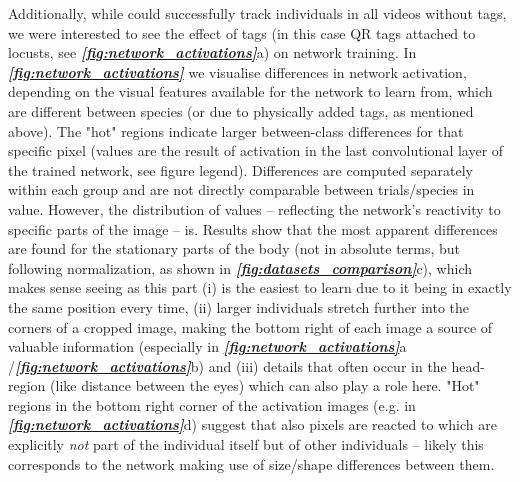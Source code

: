 \documentclass[9pt,lineno]{elife}
\newcommand{\figref}[1]{\textit{\textbf{\ref{#1}}}}
\newcommand{\TRex}{\protect\path{TRex}}
\begin{document}
Additionally, while \TRex{} could successfully track individuals in all videos without tags, we were interested to see the effect of tags (in this case QR tags attached to locusts, see \figref{fig:network_activations}a)  %
on network training. In \figref{fig:network_activations} we visualise differences in network activation, depending on the visual features available for the network to learn from, which are different between species (or due to physically added tags, as mentioned above). The "hot" regions indicate larger between-class differences for that specific pixel (values are the result of activation in the last convolutional layer of the trained network, see figure legend). Differences are computed separately within each group and are not directly comparable between trials/species in value. However, the distribution of values -- reflecting the network's reactivity to specific parts of the image -- is. Results show that the most apparent differences are found for the stationary parts of the body (not in absolute terms, but following normalization, as shown in \figref{fig:datasets_comparison}c), which makes sense seeing as this part (i) is the easiest to learn due to it being in exactly the same position every time, (ii) larger individuals stretch further into the corners of a cropped image, making the bottom right of each image a source of valuable information (especially in \figref{fig:network_activations}a%
/\figref{fig:network_activations}b) %
and (iii) details that often occur in the head-region (like distance between the eyes) which can also play a role here. "Hot" regions in the bottom right corner of the activation images (e.g. in \figref{fig:network_activations}d) %
suggest that also pixels are reacted to which are explicitly \textit{not} part of the individual itself but of other individuals -- likely this corresponds to the network making use of size/shape differences between them.
\end{document}
